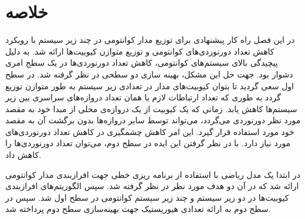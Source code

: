 \section{خلاصه}
در این فصل راه کار پیشنهادی برای توزیع مدار کوانتومی در چند زیر سیستم با رویکرد کاهش تعداد دورنوردی‌های کوانتومی و توزیع متوازن کیوبیت‌ها ارائه شد. به دلیل پیچیدگی بالای سیستم‌های کوانتومی، کاهش تعداد دورنوردی‌ها در یک سطح امری دشوار بود. جهت حل این مشکل، بهینه سازی دو سطحی در نظر گرفته شد. در سطح اول سعی گردید تا بتوان کیوبیت‌های مدار در تعدادی زیر سیستم به طور متوازن توزیع گردد به طوری که تعداد ارتباطات لازم یا همان تعداد دروازه‌های سراسری بین زیر سیستم‌ها کاهش یابد. زمانی که یک کیوبیت از یک دروازه‌ی محلی از مبدا خود به مقصد مورد نظر دورنوردی می‌گردد، می‌تواند توسط سایر دروازه‌ها بدون برگشت آن به مقصد خود مورد استفاده قرار گیرد. این امر کاهش چشمگیری در کاهش تعداد دورنوردی‌های مورد نیاز دارد. با در نظر گرفتن این ایده در سطح دوم، می‌توان تعداد دورنوردی‌ها را کاهش داد.

در ابتدا یک مدل ریاضی با استفاده از برنامه ریزی خطی جهت افرازبندی مدار کوانتومی ارائه شد که در آن دو هدف مورد نظر در نظر گرفته شد. سپس الگوریتم‌های افرازبندی کیوبیت‌ها در دو زیر سیستم و چند زیر سیستم کوانتومی در سطح اول شد. سپس در سطح دوم به ارائه تعدادی هیوریستیک جهت بهینه‌سازی سطح دوم پرداخته شد.
